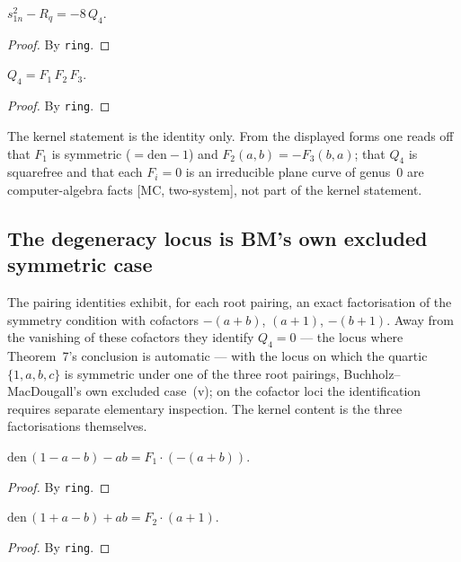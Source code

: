 \begin{lemma}\label{I2}\leanok
{}
$s_{1n}^{2}-R_{q}=-8\,Q_{4}$.
\end{lemma}
\begin{proof}\leanok
By \texttt{ring}.
\end{proof}

\begin{lemma}\label{Q4_factor}\leanok
{}
$Q_{4}=F_{1}\,F_{2}\,F_{3}$.
\end{lemma}
\begin{proof}\leanok
By \texttt{ring}.
\end{proof}

The kernel statement is the identity only.  From the displayed forms one reads off
that $F_{1}$ is symmetric ($=\mathrm{den}-1$) and $F_{2}(a,b)=-F_{3}(b,a)$; that
$Q_{4}$ is squarefree and that each $F_{i}=0$ is an irreducible plane curve of
genus~$0$ are computer-algebra facts [MC, two-system], not part of the kernel
statement.

\subsection*{The degeneracy locus is BM's own excluded symmetric case}

The pairing identities exhibit, for each root pairing, an exact factorisation of the
symmetry condition with cofactors $-(a+b)$, $(a+1)$, $-(b+1)$.  Away from the vanishing
of these cofactors they identify $Q_{4}=0$ --- the locus where Theorem~7's conclusion is
automatic --- with the locus on which the quartic $\{1,a,b,c\}$ is symmetric under one of
the three root pairings, Buchholz--MacDougall's own excluded case~(v); on the cofactor
loci the identification requires separate elementary inspection.  The kernel content is
the three factorisations themselves.

\begin{lemma}\label{pairing1}\leanok
{}
$\mathrm{den}\,(1-a-b)-ab=F_{1}\cdot(-(a+b))$.
\end{lemma}
\begin{proof}\leanok
By \texttt{ring}.
\end{proof}

\begin{lemma}\label{pairing2}\leanok
{}
$\mathrm{den}\,(1+a-b)+ab=F_{2}\cdot(a+1)$.
\end{lemma}
\begin{proof}\leanok
By \texttt{ring}.
\end{proof}

